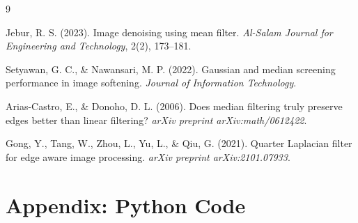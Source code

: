 \documentclass[a4paper,12pt]{article}
\begin{document}
\begin{thebibliography}{9}

Jebur, R. S. (2023). Image denoising using mean filter. 
\textit{Al-Salam Journal for Engineering and Technology}, 2(2), 173--181.

Setyawan, G. C., \& Nawansari, M. P. (2022). 
Gaussian and median screening performance in image softening. 
\textit{Journal of Information Technology}.

Arias-Castro, E., \& Donoho, D. L. (2006). 
Does median filtering truly preserve edges better than linear filtering? 
\textit{arXiv preprint arXiv:math/0612422}.

Gong, Y., Tang, W., Zhou, L., Yu, L., \& Qiu, G. (2021). 
Quarter Laplacian filter for edge aware image processing. 
\textit{arXiv preprint arXiv:2101.07933}.

\end{thebibliography}

\appendix
\section{Appendix: Python Code}
\end{document}
